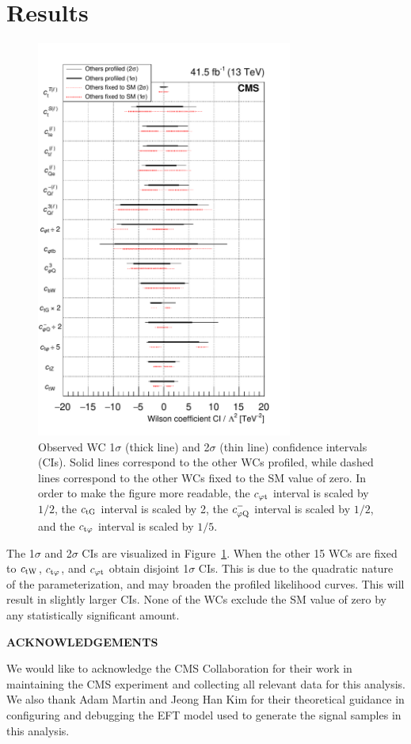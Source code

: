 \documentclass[12pt]{article}
\def\Acknowledgements{\bigskip  \bigskip \begin{center} \begin{large}
             \bf ACKNOWLEDGEMENTS \end{large}\end{center}}
\begin{document}
\section{Results}

\begin{figure}[!htbp]
	\centering
	\includegraphics[width=0.75\textwidth]{plots/BestScan}
	\caption{Observed WC 1$\sigma$ (thick line) and 2$\sigma$ (thin line) confidence intervals (CIs). Solid lines correspond to the other WCs profiled, while dashed lines correspond to the other WCs fixed to the SM value of zero. In order to make the figure more readable, the $c_{\mathrm{\varphi t}}$ interval is scaled by $1/2$, the $c_{\mathrm{tG}}$ interval is scaled by 2, the $c^{-}_{\mathrm{\varphi Q}}$ interval is scaled by $1/2$, and the $c_{\mathrm{t\varphi}}$ interval is scaled by $1/5$.}
	\label{fig:SummaryPlot}
\end{figure}

The 1$\sigma$ and 2$\sigma$ CIs are visualized in Figure~\ref{fig:SummaryPlot}. When the other 15 WCs are fixed to $c_{\mathrm{tW}}$, $c_{\mathrm{t\varphi}}$, and $c_{\mathrm{\varphi t}}$ obtain disjoint 1$\sigma$ CIs. This is due to the quadratic nature of the parameterization, and may broaden the profiled likelihood curves. This will result in slightly larger CIs. None of the WCs exclude the SM value of zero by any statistically significant amount.


\Acknowledgements
We would like to acknowledge the CMS Collaboration for their work in maintaining the CMS experiment and collecting all relevant data for this analysis. We also thank Adam Martin and Jeong Han Kim for their theoretical guidance in configuring and debugging the EFT model used to generate the signal samples in this analysis.






 
\end{document}
